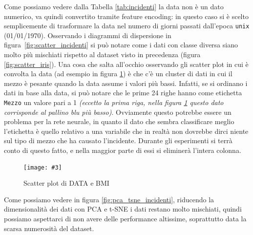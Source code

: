 \documentclass[12pt, twoside, letterpaper]{report}
\newcommand{\img}[4] {
	\begin{figure}
		\centering
		\texttt{[image: \#3]}\\
		\caption{#1}
		\label{fig:#4}
	\end{figure}
}
\begin{document}
			Come possiamo vedere dalla Tabella \ref{tab:incidenti} la data non è un dato numerico, va quindi convertito tramite feature encoding: in questo caso si è scelto semplicemente di trasformare la data nel numero di giorni passati dall'epoca \texttt{unix} (01/01/1970). Osservando i diagrammi di dispersione in figura~\ref{fig:scatter_incidenti} si può notare come i dati con classe diversa siano molto più mischiati rispetto al dataset visto in precedenza (figura \ref{fig:scatter_iris}). Una cosa che salta all'occhio osservando gli scatter plot in cui è convolta la data (ad esempio in figura \ref{fig:scatter_data}) è che c'è un cluster di dati in cui il mezzo è pesante quando la data assume i valori più bassi. Infatti, se si ordinano i dati in base alla data, si può notare che le prime 24 righe hanno come etichetta \texttt{Mezzo} un valore pari a 1 \textit{(eccetto la prima riga, nella figura \ref{fig:scatter_data} questo dato corrisponde al pallino blu più basso)}. Ovviamente questo potrebbe essere un problema per la rete neurale, in quanto il dato che sembra classificare meglio l'etichetta è quello relativo a una variabile che in realtà non dovrebbe dirci niente sul tipo di mezzo che ha causato l'incidente. Durante gli esperimenti si terrà conto di questo fatto, e nella maggior parte di essi si eliminerà l'intera colonna. 
			
			\img{Scatter plot di DATA e BMI}{0.4}{scatter_data.png}{scatter_data}
			
			Come possiamo vedere in figura \ref{fig:pca_tsne_incidenti}, riducendo la dimensionalità dei dati con PCA e t-SNE i dati restano molto mischiati, quindi possiamo aspettarci di non avere delle performance altissime, soprattutto data la scarsa numerosità del dataset.
			
\end{document}
